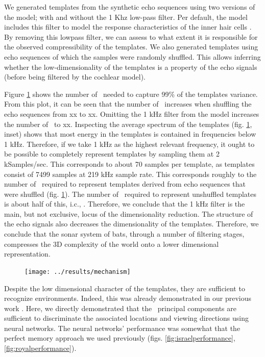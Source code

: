 \documentclass[preprint,5p]{elsarticle}
\begin{document}
We generated templates from the synthetic echo sequences using two versions of the \citet{Wiegrebe2008} model; with and without the 1 Khz low-pass filter. Per default, the model includes this filter to model the response characteristics of the inner hair cells \citep{Meddis2006,Reijniers2010a}. By removing this lowpass filter, we can assess to what extent it is responsible for the observed compressibility of the templates. We also generated templates using echo sequences of which the samples were randomly shuffled. This allows inferring whether the low-dimensionality of the templates is a property of the echo signals (before being filtered by the cochlear model). 

Figure \ref{fig:mechanism} shows the number of \pcs\ needed to capture 99\% of the templates variance. From this plot, it can be seen that the number of \pcs\ increases when shuffling the echo sequences from xx to xx. Omitting the 1 kHz filter from the  \citet{Wiegrebe2008} model increases the number of \pcs\ to xx. Inspecting the average spectrum of the templates (fig. \ref{fig:mechanism}, inset) shows that most energy in the templates is contained in frequencies below 1 kHz. Therefore, if we take 1 kHz as the highest relevant frequency, it ought to be possible to completely represent templates by sampling them at 2 kSamples/sec. This corresponds to about 70 samples per template, as templates consist of 7499 samples at 219 kHz sample rate. This corresponds roughly to the number of \pcs\ required to represent templates derived from echo sequences that were shuffled  (fig. \ref{fig:mechanism}). The number of \pcs\ required to represent unshuffled templates is about half of this, i.c., \pca. Therefore, we conclude that the 1 kHz filter is the main, but not exclusive, locus of the dimensionality reduction. The structure of the echo signals also decreases the dimensionality of the templates. Therefore, we conclude that the sonar system of bats, through a number of filtering stages, compresses the 3D complexity of the world onto a lower dimensional representation.

\begin{figure}[tb]
	\centering
	\texttt{[image: ../results/mechanism]}
	\caption{}
	\label{fig:mechanism}
\end{figure}

Despite the low dimensional character of the templates, they are sufficient to recognize environments. Indeed, this was already demonstrated in our previous work \citep{Vanderelst2016}. Here, we directly demonstrated that the \pca\ principal components are sufficient to discriminate the associated locations and viewing directions using neural networks. The neural networks' performance was somewhat that the perfect memory approach we used previously (figs. \ref{fig:israelperformance}, \ref{fig:royalperformance}).
\end{document}
